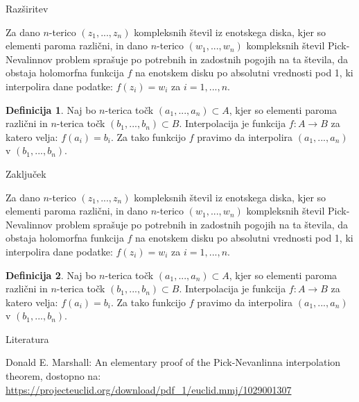 \documentclass{beamer}
\theoremstyle{definition} %
\newtheorem{definicija}{Definicija}[section]
\theoremstyle{plain} %
\begin{document}
	\begin{frame}{Razširitev}
		
		Za dano $n$-terico $(z_1,...,z_n)$ kompleksnih števil iz enotskega diska, kjer so elementi paroma različni, in dano $n$-terico $(w_1,...,w_n)$ kompleksnih števil Pick-Nevalinnov problem sprašuje po potrebnih in zadostnih pogojih na ta števila, da obstaja holomorfna funkcija $f$ na enotskem disku po absolutni vrednosti pod 1, ki interpolira dane podatke: $f(z_i) = w_i$ za $i = 1,...,n$. 

		\begin{definicija}
			Naj bo $n$-terica točk $(a_1,...,a_n) \subset A$, kjer so elementi paroma različni in $n$-terica točk $(b_1,...,b_n) \subset B$. Interpolacija je funkcija $f:A \rightarrow B$ za katero velja: $f(a_i) = b_i$. Za tako funkcijo  $f$ pravimo da interpolira $(a_1,...,a_n)$ v  $(b_1,...,b_n)$.
		\end{definicija}
		
	\end{frame}



	\begin{frame}{Zaključek}
		
		Za dano $n$-terico $(z_1,...,z_n)$ kompleksnih števil iz enotskega diska, kjer so elementi paroma različni, in dano $n$-terico $(w_1,...,w_n)$ kompleksnih števil Pick-Nevalinnov problem sprašuje po potrebnih in zadostnih pogojih na ta števila, da obstaja holomorfna funkcija $f$ na enotskem disku po absolutni vrednosti pod 1, ki interpolira dane podatke: $f(z_i) = w_i$ za $i = 1,...,n$. 

		\begin{definicija}
			Naj bo $n$-terica točk $(a_1,...,a_n) \subset A$, kjer so elementi paroma različni in $n$-terica točk $(b_1,...,b_n) \subset B$. Interpolacija je funkcija $f:A \rightarrow B$ za katero velja: $f(a_i) = b_i$. Za tako funkcijo  $f$ pravimo da interpolira $(a_1,...,a_n)$ v  $(b_1,...,b_n)$.
		\end{definicija}
		
	\end{frame}
	
	
	
	
	\begin{frame}{Literatura}
		\begin{thebibliography}{1}
			
			Donald E. Marshall:
			An elementary proof of the Pick-Nevanlinna interpolation theorem, dostopno na:
			\url{https://projecteuclid.org/download/pdf_1/euclid.mmj/1029001307}
			
			
			
		\end{thebibliography}
	\end{frame}
	
	
\end{document}
